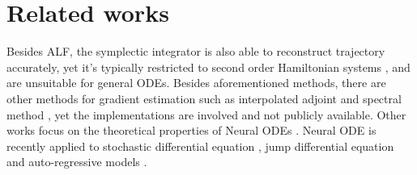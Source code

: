\documentclass{article} \usepackage{iclr2021_conference,times}
\begin{document}
\section{Related works}
\vspace{-2mm}
Besides ALF, the symplectic integrator \citep{verlet1967computer, yoshida1990construction} is also able to reconstruct trajectory accurately, yet it's typically restricted to second order Hamiltonian systems \citep{de1990hamiltonian}, and are unsuitable for general ODEs. Besides aforementioned methods, there are other methods for gradient estimation such as interpolated adjoint \citep{daulbaev2020interpolated} and spectral method \citep{quaglino2019snode}, yet the implementations are involved and not publicly available. Other works focus on the theoretical properties of Neural ODEs \citep{dupont2019augmented, tabuada2020universal,massaroli2020dissecting}. Neural ODE is recently applied to stochastic differential equation \citep{li2020scalable}, jump differential equation \citep{jia2019neural} and auto-regressive models \citep{wehenkel2019unconstrained}.
\end{document}
